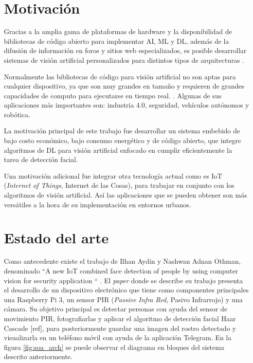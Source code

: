 \section{Motivación}
Gracias a la amplia gama de plataformas de hardware y la disponibilidad de bibliotecas de código abierto para implementar AI, ML y DL, además de la difusión de información en foros y sitios web especializados, es posible desarrollar sistemas de visión artificial personalizados para distintos tipos de arquitecturas \cite{mot_emb}.

Normalmente las bibliotecas de código para visión artificial no son aptas para cualquier dispositivo, ya que son muy grandes en tamaño y requieren de grandes capacidades de computo para ejecutarse en tiempo real. . Algunas de sus aplicaciones más importantes son: industria 4.0, seguridad, vehículos autónomos y robótica.

La motivación principal de este trabajo fue desarrollar un sistema embebido de bajo costo económico, bajo consumo energético y de código abierto, que integre algoritmos de DL para visión artificial enfocado en cumplir eficientemente la tarea de detección facial.

Una motivación adicional fue integrar otra tecnología actual como es IoT (\textit{Internet of Things}, Internet de las Cosas), para trabajar en conjunto con los algoritmos de visión artificial. Así las aplicaciones que se pueden obtener son más versátiles a la hora de su implementación en entornos urbanos.

\section{Estado del arte}
Como antecedente existe el trabajo de Ilhan Aydin y Nashwan Adnan Othman, denominado ``A new IoT combined face detection of people by using computer vision for security application
`` \cite{soa_ref}. El \textit{paper} donde se describe su trabajo presenta el desarrollo de un dispositivo electrónico que tiene como componentes principales una Raspberry Pi 3, un sensor PIR (\textit{Passive Infra Red}, Pasivo Infrarrojo) y una cámara. Su objetivo principal es detectar personas con ayuda del sensor de movimiento PIR, fotografiarlas y aplicar el algoritmo de detección facial Haar Cascade [ref], para posteriormente guardar una imagen del rostro detectado y visualizarla en un teléfono móvil con ayuda de la aplicación Telegram. En la figura \ref{fig:soa_arch} se puede observar el diagrama en bloques del sistema descrito anteriormente.

